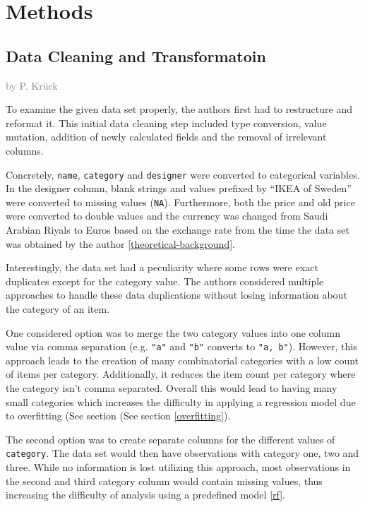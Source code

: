 \documentclass[a4paper, nobind]{templates/ociamthesis}
\begin{document}
\hypertarget{methods}{%
\chapter{Methods}\label{methods}}

\hypertarget{datacleaning}{%
\section{Data Cleaning and Transformatoin}\label{datacleaning}}

\textcolor{gray}{by P. Krück}

To examine the given data set properly, the authors first had to restructure and reformat it. This initial data cleaning step included type conversion, value mutation, addition of newly calculated fields and the removal of irrelevant columns.

Concretely, \texttt{name}, \texttt{category} and \texttt{designer} were converted to categorical variables. In the designer column, blank strings and values prefixed by ``IKEA of Sweden'' were converted to missing values (\texttt{NA}). Furthermore, both the price and old price were converted to double values and the currency was changed from Saudi Arabian Riyals to Euros based on the exchange rate from the time the data set was obtained by the author \ref{theoretical-background}.

Interestingly, the data set had a peculiarity where some rows were exact duplicates except for the category value. The authors considered multiple approaches to handle these data duplications without losing information about the category of an item.

One considered option was to merge the two category values into one column value via comma separation (e.g. \texttt{"a"} and \texttt{"b"} converts to \texttt{"a,\ b"}). However, this approach leads to the creation of many combinatorial categories with a low count of items per category.
Additionally, it reduces the item count per category where the category isn't comma separated.
Overall this would lead to having many small categories which increases the difficulty in applying a regression model due to overfitting (See section (See section \ref{overfitting}).

The second option was to create separate columns for the different values of \texttt{category}. The data set would then have observations with category one, two and three. While no information is lost utilizing this approach, most observations in the second and third category column would contain missing values, thus increasing the difficulty of analysis using a predefined model \ref{rf}.
\end{document}

